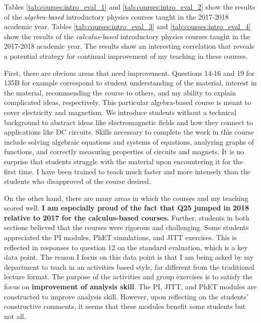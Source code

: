 \documentclass[../../main.tex]{subfiles}
\begin{document}
Tables \ref{tab:courses:intro_eval_1} and \ref{tab:courses:intro_eval_2} show the results of the \textit{algebra-based} introductory physics courses taught in the 2017-2018 academic year.  Tables \ref{tab:courses:intro_eval_3} and \ref{tab:courses:intro_eval_4} show the results of the \textit{calculus-based} introductory physics courses taught in the 2017-2018 academic year.  The results show an interesting correlation that reveals a potential strategy for continual improvement of my teaching in these courses. \\ \hspace{0.1cm}

First, there are obvious areas that need improvement.  Questions 14-16 and 19 for 135B for example correspond to student understanding of the material, interest in the material, recommending the course to others, and my ability to explain complicated ideas, respectively.  This particular algebra-based course is meant to cover electricity and magnetism.  We introduce students without a technical background to abstract ideas like electromagnetic fields and how they connect to applications like DC circuits.  Skills necessary to complete the work in this course include solving algebraic equations and systems of equations, analyzing graphs of functions, and correctly measuring properties of circuits and magnets.  It is no surprise that students struggle with the material upon encountering it for the first time.  I have been trained to teach much faster and more intensely than the students who disapproved of the course desired. \\ \hspace{0.1cm}

On the other hand, there are many areas in which the courses and my teaching scored well.  \textbf{I am especially proud of the fact that Q25 jumped in 2018 relative to 2017 for the calculus-based courses.}  Further, students in both sections believed that the courses were rigorous and challenging.  Some students appreciated the PI modules, PhET simulations, and JITT exercises.  This is reflected in responses to question 12 on the standard evaluation, which is a key data point.  The reason I focus on this data point is that I am being asked by my department to teach in an activities based style, far different from the traditional lecture format.  The purpose of the activities and group exercises is to satisfy the focus on \textbf{improvement of analysis skill}.  The PI, JITT, and PhET modules are constructed to improve analysis skill.  However, upon reflecting on the students' constructive comments, it seems that these modules benefit some students but not all. \\ \hspace{0.1cm}
\end{document}
